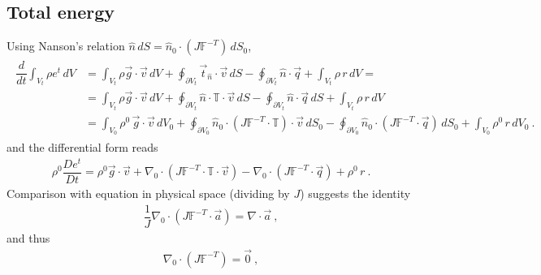 \documentclass[letterpaper,10pt,english]{jupyterBook}
\begin{document}
\subsection{Total energy}
\label{\detokenize{ch/continuum/balance-reference-integral:total-energy}}\label{\detokenize{ch/continuum/balance-reference-integral:continuum-governing-equations-reference-integral-total-energy}}
\sphinxAtStartPar
Using Nanson’s relation \(\hat{n} \, dS = \hat{n}_0 \cdot \left(J \mathbb{F}^{-T}\right) \, d S_0\),
\begin{equation*}
\begin{split}\begin{aligned}
  \dfrac{d}{d t} \int_{V_t} \rho e^t \, dV
  & = \int_{V_t} \rho \vec{g} \cdot \vec{v} \, dV + \oint_{\partial V_t} \vec{t}_{\hat{n}} \cdot \vec{v}  \, dS - \oint_{\partial V_t} \hat{n} \cdot \vec{q} + \int_{V_t} \rho \, r \, dV = \\
  & = \int_{V_t} \rho \vec{g} \cdot \vec{v} \, dV + \oint_{\partial V_t} \hat{n} \cdot \mathbb{T} \cdot \vec{v} \, dS - \oint_{\partial V_t} \hat{n} \cdot \vec{q} \, dS + \int_{V_t} \rho \, r \, dV \\
  & = \int_{V_0} \rho^0 \, \vec{g} \cdot \vec{v} \, dV_0 + \oint_{\partial V_0} \hat{n}_0 \cdot \left( J \mathbb{F}^{-T} \cdot \mathbb{T} \right) \cdot \vec{v} \, dS_0 - \oint_{\partial V_0} \hat{n}_0 \cdot \left( J \mathbb{F}^{-T} \cdot \vec{q} \right) \, dS_0 + \int_{V_0} \rho^0 \, r \, dV_0 \ .
\end{aligned}\end{split}
\end{equation*}
\sphinxAtStartPar
and the differential form reads
\begin{equation*}
\begin{split}
\rho^0 \dfrac{D e^t}{Dt} = \rho^0 \vec{g} \cdot \vec{v} + \nabla_0 \cdot \left( J \mathbb{F}^{-T} \cdot \mathbb{T} \cdot \vec{v} \right) - \nabla_0 \cdot \left( J \mathbb{F}^{-T} \cdot \vec{q} \right) + \rho^0 \, r \ .
\end{split}
\end{equation*}
\sphinxAtStartPar
Comparison with equation in physical space (dividing by \(J\)) suggests the identity
\begin{equation*}
\begin{split}\dfrac{1}{J} \nabla_0 \cdot \left( J \mathbb{F}^{-T} \cdot \vec{a} \right) = \nabla \cdot \vec{a} \ ,\end{split}
\end{equation*}
\sphinxAtStartPar
and thus
\begin{equation*}
\begin{split}\nabla_0 \cdot ( J \mathbb{F}^{-T} ) = \vec{0} \ ,\end{split}
\end{equation*}
\end{document}
